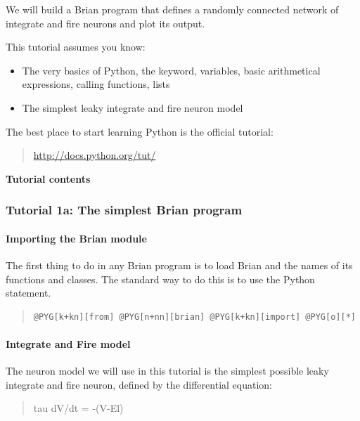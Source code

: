 \documentclass[letterpaper,10pt,english]{manual}
\begin{document}
We will build a Brian program that defines a randomly connected network of integrate
and fire neurons and plot its output.

This tutorial assumes you know:
\begin{itemize}
\item {} 
The very basics of Python, the  keyword, variables, basic
arithmetical expressions, calling functions, lists

\item {} 
The simplest leaky integrate and fire neuron model

\end{itemize}

The best place to start learning Python is the official tutorial:
\begin{quote}

\href{http://docs.python.org/tut/}{http://docs.python.org/tut/}
\end{quote}

\textbf{Tutorial contents}

\resetcurrentobjects
\hypertarget{--doc-tutorial_1a_the_simplest_brian_program}{}

\subsubsection{Tutorial 1a: The simplest Brian program}


\paragraph{Importing the Brian module}

The first thing to do in any Brian program is to load Brian and the names of
its functions and classes. The standard way to do this is to use the Python
 statement.
\begin{quote}

\begin{Verbatim}[commandchars=@\[\]]
@PYG[k+kn][from] @PYG[n+nn][brian] @PYG[k+kn][import] @PYG[o][*]
\end{Verbatim}
\end{quote}


\paragraph{Integrate and Fire model}

The neuron model we will use in this tutorial is the simplest possible
leaky integrate and fire neuron, defined by the differential equation:
\begin{quote}

tau dV/dt = -(V-El)
\end{quote}
\end{document}
